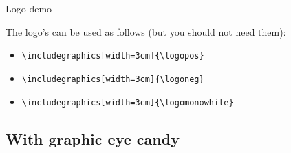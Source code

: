 \documentclass[aspectratio=1610]{beamer}
\newcommand*\command[1]{{\tt \textbackslash #1}}
\begin{document}
\begin{frame}[t]
  {Logo demo}

  The logo's can be used as follows (but you should not need them):
  \begin{itemize}
  \item \command{includegraphics[width=3cm]\{\command{logopos}\}}\\
    \begin{center}
    \end{center}
  \item \command{includegraphics[width=3cm]\{\command{logoneg}\}}\\
    \begin{center}
    \end{center}
  \item \command{includegraphics[width=3cm]\{\command{logomonowhite}\}}\\
    \begin{center}
    \end{center}
  \end{itemize}
\end{frame}

\subsection{With graphic eye candy}

\begin{frame}[negative]
  \subsectionpage
\end{frame}
\end{document}
